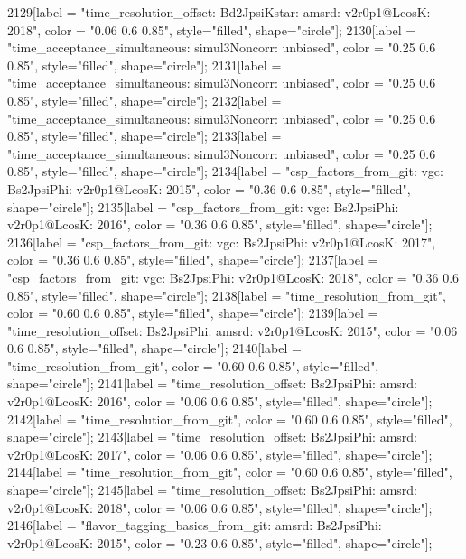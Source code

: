 {	2129[label = "time_resolution_offset\nmode: Bd2JpsiKstar\ntimeres: amsrd\nversion: v2r0p1@LcosK\nyear: 2018", color = "0.06 0.6 0.85", style="filled", shape="circle"];
	2130[label = "time_acceptance_simultaneous\ntimeacc: simul3Noncorr\ntrigger: unbiased", color = "0.25 0.6 0.85", style="filled", shape="circle"];
	2131[label = "time_acceptance_simultaneous\ntimeacc: simul3Noncorr\ntrigger: unbiased", color = "0.25 0.6 0.85", style="filled", shape="circle"];
	2132[label = "time_acceptance_simultaneous\ntimeacc: simul3Noncorr\ntrigger: unbiased", color = "0.25 0.6 0.85", style="filled", shape="circle"];
	2133[label = "time_acceptance_simultaneous\ntimeacc: simul3Noncorr\ntrigger: unbiased", color = "0.25 0.6 0.85", style="filled", shape="circle"];
	2134[label = "csp_factors_from_git\ncsp: vgc\nmode: Bs2JpsiPhi\nversion: v2r0p1@LcosK\nyear: 2015", color = "0.36 0.6 0.85", style="filled", shape="circle"];
	2135[label = "csp_factors_from_git\ncsp: vgc\nmode: Bs2JpsiPhi\nversion: v2r0p1@LcosK\nyear: 2016", color = "0.36 0.6 0.85", style="filled", shape="circle"];
	2136[label = "csp_factors_from_git\ncsp: vgc\nmode: Bs2JpsiPhi\nversion: v2r0p1@LcosK\nyear: 2017", color = "0.36 0.6 0.85", style="filled", shape="circle"];
	2137[label = "csp_factors_from_git\ncsp: vgc\nmode: Bs2JpsiPhi\nversion: v2r0p1@LcosK\nyear: 2018", color = "0.36 0.6 0.85", style="filled", shape="circle"];
	2138[label = "time_resolution_from_git", color = "0.60 0.6 0.85", style="filled", shape="circle"];
	2139[label = "time_resolution_offset\nmode: Bs2JpsiPhi\ntimeres: amsrd\nversion: v2r0p1@LcosK\nyear: 2015", color = "0.06 0.6 0.85", style="filled", shape="circle"];
	2140[label = "time_resolution_from_git", color = "0.60 0.6 0.85", style="filled", shape="circle"];
	2141[label = "time_resolution_offset\nmode: Bs2JpsiPhi\ntimeres: amsrd\nversion: v2r0p1@LcosK\nyear: 2016", color = "0.06 0.6 0.85", style="filled", shape="circle"];
	2142[label = "time_resolution_from_git", color = "0.60 0.6 0.85", style="filled", shape="circle"];
	2143[label = "time_resolution_offset\nmode: Bs2JpsiPhi\ntimeres: amsrd\nversion: v2r0p1@LcosK\nyear: 2017", color = "0.06 0.6 0.85", style="filled", shape="circle"];
	2144[label = "time_resolution_from_git", color = "0.60 0.6 0.85", style="filled", shape="circle"];
	2145[label = "time_resolution_offset\nmode: Bs2JpsiPhi\ntimeres: amsrd\nversion: v2r0p1@LcosK\nyear: 2018", color = "0.06 0.6 0.85", style="filled", shape="circle"];
	2146[label = "flavor_tagging_basics_from_git\nflavor: amsrd\nmode: Bs2JpsiPhi\nversion: v2r0p1@LcosK\nyear: 2015", color = "0.23 0.6 0.85", style="filled", shape="circle"];
}
